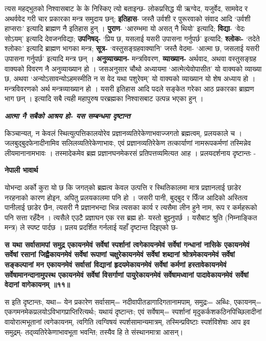 \documentclass[11pt, a5paper]{article}
\begin{document}
त्यस महद्भुतको निश्वासबाट के के निस्किए त्यो बताइन्छ- लोकप्रसिद्ध यी ऋग्वेद, यजुर्वेद, सामवेद र अथर्ववेद गरी चार प्रकारका मन्त्र समुदाय छन्; \textbf{इतिहास}- जस्तै उर्वशी र पुरूरवाको संवाद आदि ‘उर्वशी हाप्सराः’ इत्यादि ब्राह्मण नै इतिहास हुन् । \textbf{पुराण}- ‘आरम्भमा यो असत् नै थियो’ इत्यादि; \textbf{विद्या}- ‘वेदः सोऽयम्’ इत्यादि देवजनविद्या; \textbf{उपनिषद्-} ‘प्रिय छ, यसलाई यसरी उपासना गर्नुपर्छ’ इत्यादि; \textbf{श्लोकः-} ‘तदेते श्लोकाः’ इत्यादि ब्राह्मण भागका मन्त्र; \textbf{सूत्र-} ‘वस्तुसङ्ग्रहवाक्यानि’ जस्तै वेदमा- ‘आत्मा छ, जसलाई यसरी उपासना गर्नुपर्छ’ इत्यादि मन्त्र छन् । \textbf{अनुव्याख्यान-} मन्त्रविवरण, \textbf{व्याख्यान-} अर्थवाद, अथवा वस्तुसङ्‍ग्रह वाक्यको विवरण नै अनुव्याख्यान हो । जसअनुसार चौथो अध्यायमा ‘आत्मेत्येवोपासीत’ यो वाक्यको व्याख्या छ, अथवा ‘अन्योऽसावन्योऽहमस्मीति न स वेद यथा पशुरेवम्’ यो वाक्यको व्याख्यान यो शेष अध्याय हो । मन्त्रविवरणको अर्थ मन्त्रव्याख्यान हो । यसरी इतिहास आदि पदले सङ्‌केत गरेका आठ प्रकारका ब्राह्मण भाग छन् । इत्यादि सबै त्यही महापुरुष परब्रह्मका निश्वासबाट उत्पन्न भएका हुन् ।

\textit{\textbf{आत्मा नै सबैको आश्रय हो- यस सम्बन्धमा दृष्टान्त}}

किञ्चान्यत्, न केवलं स्थित्युत्पत्तिकालयोरेव प्रज्ञानव्यतिरेकेणाभवाज्जगतो ब्रह्मत्वम्, प्रलयकाले च । जलबुद्‍बुदफेनादीनामिव सलिलव्यतिरेकेणाभावः, एवं प्रज्ञानव्यतिरेकेण तत्कार्याणां नामरूपकर्मणां तस्मिन्नेव लीयमानानामभावः । तस्मादेकमेव ब्रह्म प्रज्ञानघनमेकरसं प्रतिपत्तव्यमित्यत आह । प्रलयदर्शनाय दृष्टान्तः -

\textbf{नेपाली भावार्थ}

योभन्दा अर्को कुरा यो छ कि जगत्‌को ब्रह्मत्व केवल उत्पत्ति र स्थितिकालमा मात्र प्रज्ञानलाई छाडेर नरहनाको कारण होइन, अपितु प्रलयकालमा पनि हो । जसरी पानी, बुद्‍बुद र फिँज आदिको अस्तित्व पानीलाई छाडेर छैन, त्यसरी नै प्रज्ञानभन्दा भिन्न त्यसका कार्य र त्यसैमा लीन हुने नाम, रूप र कर्महरूको पनि सत्ता रहँदैन । त्यसैले एउटै प्रज्ञाघन एक रस ब्रह्म हो- यस्तो बुझ्नुपर्छ । यसैबाट श्रुति (निम्नाङ्कित मन्त्र) ले स्पष्ट पार्दछ । प्रलय प्रदर्शित गर्नलाई यहाँ दृष्टान्त दिइएको छ-

\textbf{स यथा सर्वासामपां समुद्र एकायनमेवं सर्वेषां स्पर्शानां त्वगेकायनमेवं सर्वेषां गन्धानां नासिके एकायनमेवं सर्वेषां रसानां जिह्वैकायनमेवं सर्वेषां रूपाणां चक्षुरेकायनमेवं सर्वेषां शब्दानां श्रोत्रमेकायनमेवं सर्वेषां सङ्‍कल्पानां मन एकायनमेवं सर्वासां विद्यानां हृदयमेकायनमेवं सर्वेषां कर्मणां हस्तावेकायनमेवं सर्वेषामानन्दानामुपस्थ एकायनमेवं सर्वेषां विसर्गाणां पायुरेकायनमेवं सर्वेषामध्वानां पादावेकायनमेवं सर्वेषां वेदानां वागेकायनम् ॥११॥}

स इति दृष्टान्तः, यथा= येन प्रकारेण सर्वासाम्= नदीवापीतडागादिगतानामपाम्, समुद्रः= अब्धिः, एकायनम्= एकगमनमेकप्रलयोऽविभागप्राप्तिरित्यर्थः; यथायं दृष्टान्तः; एवं सर्वेषाम्= स्पर्शानां मृदुकर्कशकठिनपिच्छिलादीनां वायोरात्मभूतानां त्वगेकायनम्, त्वगिति त्वग्विषयं स्पर्शसामान्यमात्रम्, तस्मिन्प्रविष्टाः स्पर्शविशेषाः  आप इव समुद्रम्- तद्‍व्यतिरेकेणाभावभूता भवन्ति; तस्यैव हि ते संस्थानमात्रा आसन्।
\end{document}
